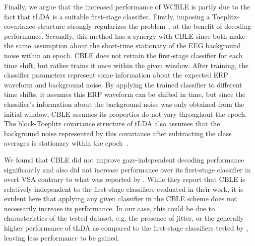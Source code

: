 
Finally, we argue that the increased performance of WCBLE is partly due to the
fact that
tLDA is a suitable first-stage classifier.
Firstly, imposing a Toeplitz-covariance structure strongly regularizes the
problem~\cite{Sosulski2022,VanDenKerchove2022}, at the benefit of decoding performance.
Secondly, this method has a synergy with CBLE since both make the same
assumption about the short-time stationary of the EEG background noise
within an epoch.
CBLE does not retrain the first-stage classifier for each time shift, but
rather trains it once within the given window.
After training, the classifier parameters represent some information about the
expected ERP waveform and background noise.
By applying the trained classifier to different time shifts, it assumes this
ERP waveform can be shifted in time, but since the classifier's information about
the background noise was only obtained from the initial window, CBLE assumes
its properties do not vary throughout the epoch.
The block-Toeplitz covariance structure of tLDA also assumes that the
background noise represented by this covariance after subtracting the class
averages is stationary within the epoch~\cite{Sosulski2022}.

We found that CBLE did not improve gaze-independent decoding performance
significantly and also did not increase performance over its first-stage
classifier in overt VSA contrary to what was reported
by \cite{Mowla2017}.
While they report that CBLE is relatively independent to the
first-stage classifiers evaluated in their work, it is evident here that
applying any given classifier in the CBLE scheme does not necessarily increase
its performance.
In our case, this could be due to characteristics of the tested dataset, e.g.
the presence of jitter, or the generally higher performance of tLDA as compared to the
first-stage classifiers tested by \cite{Mowla2017}, leaving less
performance to be gained.


